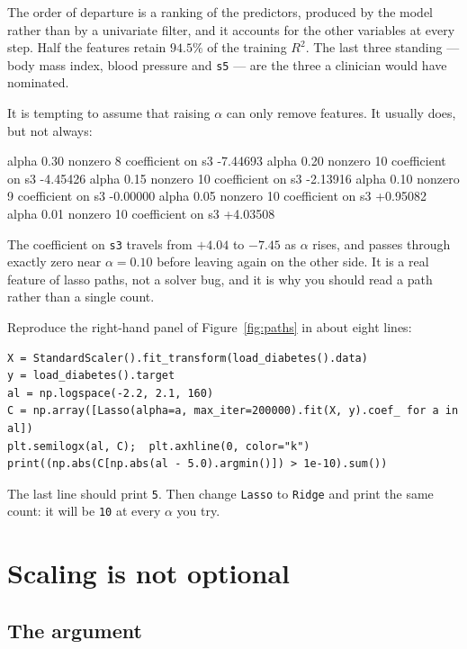 \documentclass[11pt]{article}
\begin{document}
The order of departure is a ranking of the predictors, produced by the model
rather than by a univariate filter, and it accounts for the other variables at
every step. Half the features retain $94.5\%$ of the training $R^2$. The last
three standing --- body mass index, blood pressure and \texttt{s5} --- are the
three a clinician would have nominated.

\begin{caution}
It is tempting to assume that raising $\alpha$ can only remove features. It
usually does, but not always:
\begin{codeout}
   alpha  0.30  nonzero  8   coefficient on s3 -7.44693
   alpha  0.20  nonzero 10   coefficient on s3 -4.45426
   alpha  0.15  nonzero 10   coefficient on s3 -2.13916
   alpha  0.10  nonzero  9   coefficient on s3 -0.00000
   alpha  0.05  nonzero 10   coefficient on s3 +0.95082
   alpha  0.01  nonzero 10   coefficient on s3 +4.03508
\end{codeout}
The coefficient on \texttt{s3} travels from $+4.04$ to $-7.45$ as $\alpha$
rises, and passes through exactly zero near $\alpha = 0.10$ before leaving
again on the other side. It is a real feature of lasso paths, not a solver
bug, and it is why you should read a path rather than a single count.
\end{caution}

\begin{tryit}
Reproduce the right-hand panel of Figure~\ref{fig:paths} in about eight lines:
\begin{lstlisting}
X = StandardScaler().fit_transform(load_diabetes().data)
y = load_diabetes().target
al = np.logspace(-2.2, 2.1, 160)
C = np.array([Lasso(alpha=a, max_iter=200000).fit(X, y).coef_ for a in al])
plt.semilogx(al, C);  plt.axhline(0, color="k")
print((np.abs(C[np.abs(al - 5.0).argmin()]) > 1e-10).sum())
\end{lstlisting}
The last line should print \texttt{5}. Then change \texttt{Lasso} to
\texttt{Ridge} and print the same count: it will be \texttt{10} at every
$\alpha$ you try.
\end{tryit}

\section{Scaling is not optional}
\label{sec:scale}

\subsection{The argument}
\end{document}
